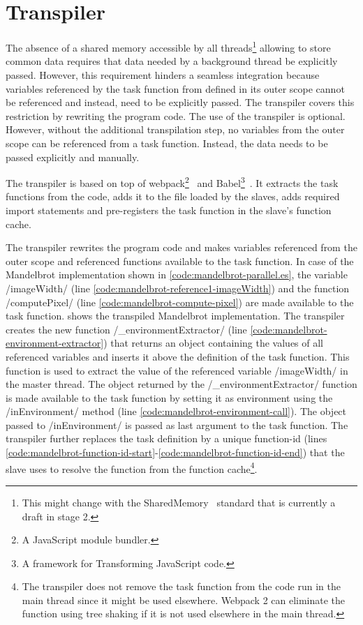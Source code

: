 \section{Transpiler}\label{sec:transpiler}
The absence of a shared memory accessible by all threads\footnote{This might change with the SharedMemory~\cite{Ecma2016} standard that is currently a draft in stage 2.} allowing to store common data requires that data needed by a background thread be explicitly passed. However, this requirement hinders a seamless integration because variables referenced by the task function from defined in its outer scope cannot be referenced and instead, need to be explicitly passed. The transpiler covers this restriction by rewriting the program code. The use of the transpiler is optional. However, without the additional transpilation step, no variables from the outer scope can be referenced from a task function. Instead, the data needs to be passed explicitly and manually. 


The transpiler is based on top of webpack\footnote{A JavaScript module bundler.}~\cite{webpack} and Babel\footnote{A framework for Transforming JavaScript code.}~\cite{babel}. It extracts the task functions from the code, adds it to the file loaded by the slaves, adds required import statements and pre-registers the task function in the slave's function cache. 

The transpiler rewrites the program code and makes variables referenced from the outer scope and referenced functions available to the task function. In case of the Mandelbrot implementation shown in \cref{code:mandelbrot-parallel.es}, the variable \javascriptinline/imageWidth/ (line \ref{code:mandelbrot-reference1-imageWidth}) and the function \javascriptinline/computePixel/ (line \ref{code:mandelbrot-compute-pixel}) are made available to the task function.  shows the transpiled Mandelbrot implementation. The transpiler creates the new function \javascriptinline/_environmentExtractor/ (line \ref{code:mandelbrot-environment-extractor}) that returns an object containing the values of all referenced variables and inserts it above the definition of the task function. This function is used to extract the value of the referenced variable \javascriptinline/imageWidth/ in the master thread. The object returned by the \javascriptinline/_environmentExtractor/ function is made available to the task function by setting it as environment using the \javascriptinline/inEnvironment/ method (line \ref{code:mandelbrot-environment-call}). The object passed to \javascriptinline/inEnvironment/ is passed as last argument to the task function. The transpiler further replaces the task definition by a unique function-id (lines \ref{code:mandelbrot-function-id-start}-\ref{code:mandelbrot-function-id-end}) that the slave uses to resolve the function from the function cache\footnote{The transpiler does not remove the task function from the code run in the main thread since it might be used elsewhere. Webpack 2 can eliminate the function using tree shaking if it is not used elsewhere in the main thread.}. 

